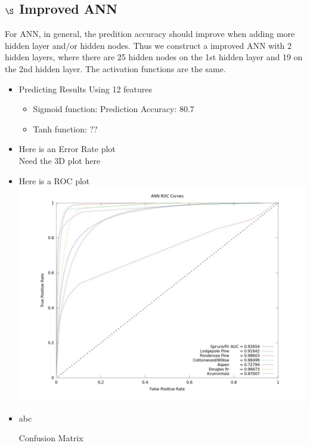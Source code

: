 \documentclass[11pt]{article}  %
\begin{document}
\subsection*{$\S$ Improved ANN}
For ANN, in general, the predition accuracy should improve when adding more hidden layer and/or hidden nodes. Thus we construct a improved ANN with 2 hidden layers, where there are 25 hidden nodes on the 1st hidden layer and 19 on the 2nd hidden layer. The activation functions are the same.
\begin{itemize}
\item Predicting Results Using 12 features
\begin{itemize}

\item Sigmoid function: Prediction Accuracy: 80.7%

\item Tanh function: ??

\end{itemize}
\item Here is an Error Rate plot\\
Need the 3D plot here


\item Here is a ROC plot\\
\includegraphics[scale=0.45]{ANNROCall}

\item abc\\
\begin{table} [h]
\caption{Confusion Matrix} %
\centering



\end{table}
\end{itemize}
\end{document}
